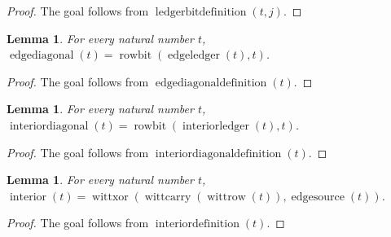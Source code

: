\documentclass[11pt]{article}
\newtheorem{lemma}[theorem]{Lemma}
\theoremstyle{definition}
\begin{document}
\begin{proof}
The goal follows from \(\operatorname{ledgerbitdefinition}(t, j)\).
\end{proof}
\begin{lemma}
\label{ll:observations:edge-diagonal-definition}
For every natural number \(t\), \(\operatorname{edgediagonal}(t) = \operatorname{rowbit}(\operatorname{edgeledger}(t), t)\).
\end{lemma}
\begin{proof}
The goal follows from \(\operatorname{edgediagonaldefinition}(t)\).
\end{proof}
\begin{lemma}
\label{ll:observations:interior-diagonal-definition}
For every natural number \(t\), \(\operatorname{interiordiagonal}(t) = \operatorname{rowbit}(\operatorname{interiorledger}(t), t)\).
\end{lemma}
\begin{proof}
The goal follows from \(\operatorname{interiordiagonaldefinition}(t)\).
\end{proof}
\begin{lemma}
\label{ll:observations:interior-definition}
For every natural number \(t\), \(\operatorname{interior}(t) = \operatorname{wittxor}(\operatorname{wittcarry}(\operatorname{wittrow}(t)), \operatorname{edgesource}(t))\).
\end{lemma}
\begin{proof}
The goal follows from \(\operatorname{interiordefinition}(t)\).
\end{proof}
\end{document}
